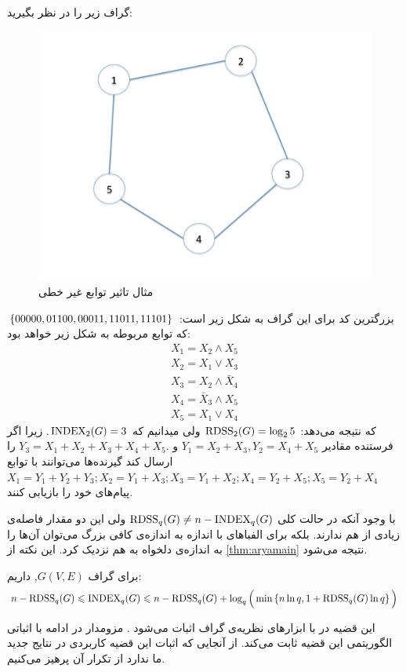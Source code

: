  \begin{example}
 	گراف زیر را در نظر بگیرید:
\begin{figure}[H]
	\centering
	\includegraphics[width=0.4\linewidth]{figs/chapter6/storage-graph-pent}
	\caption[مثال تاثیر توابع غیر خطی]{
		مثال تاثیر توابع غیر خطی
	\cite{arya}
	}
	\label{fig:storage-graph-pent}
\end{figure}
بزرگترین کد برای این گراف به شکل زیر است:
$\left\{ 00000,01100,00011,11011,11101 \right\}$
که توابع مربوطه به شکل زیر خواهد بود:
\begin{align*}
	X_1 = X_2 \wedge X_5 \\
	X_2 = X_1 \vee X_3 \\
	X_3 = X_2 \wedge \bar{X}_4 \\
	X_4 = \bar{X}_3 \wedge X_5 \\
	X_5 = X_1\vee X_4
\end{align*}
که نتیجه می‌دهد:
$\mathrm{RDSS}_2(G) = \log_2 5$
ولی میدانیم که
$\mathrm{INDEX}_2(G)=3$.
زیرا اگر فرستنده مقادیر
 $Y_1= X_2+X_3, Y_2= X_4+X_5$ 
 و
  $Y_3= X_1+X_2+X_3+X_4+X_5.$
  را ارسال کند گیرنده‌ها می‌توانند با توابع
  $X_1 = Y_1 + Y_2+Y_3; X_2 = Y_1+X_3; X_3 = Y_1+X_2; X_4 = Y_2+X_5; X_5 = Y_2+X_4$
  پیام‌های خود را بازیابی کنند.
 \end{example}
 
 با وجود آنکه در حالت کلی 
 $\mathrm{RDSS}_q(G) \ne n - \mathrm{INDEX}_q(G)$
 ولی این دو مقدار فاصله‌ی زیادی از هم ندارند. بلکه برای الفباهای با اندازه به اندازه‌ی کافی بزرگ می‌توان آن‌ها را به اندازه‌ی دلخواه به هم نزدیک کرد. این نکته از 
 \autoref{thm:aryamain}
 نتیجه می‌شود.
 \begin{theorem}\label{thm:aryamain}
 	برای گراف
 	 $G(V,E)$,
 	 داریم:
 	\begin{align}
 		n - \mathrm{RDSS}_q(G) \leqslant \mathrm{INDEX}_q(G) \leqslant n -\mathrm{RDSS}_q(G) + \log_q\Big(\min\left\{ n\ln q, 1+ \mathrm{RDSS}_q(G)\ln q  \right\}\Big)
 	\end{align}
 \end{theorem}
 
 این قضیه در
 \cite{4691014}
 با ابزارهای نظریه‌ی گراف اثبات می‌شود . مزومدار در ادامه با اثباتی الگوریتمی این قضیه ثابت می‌کند. از آنجایی که اثبات این قضیه کاربردی در نتایج جدید ما ندارد از تکرار آن پرهیز می‌کنیم.
 \newpage

